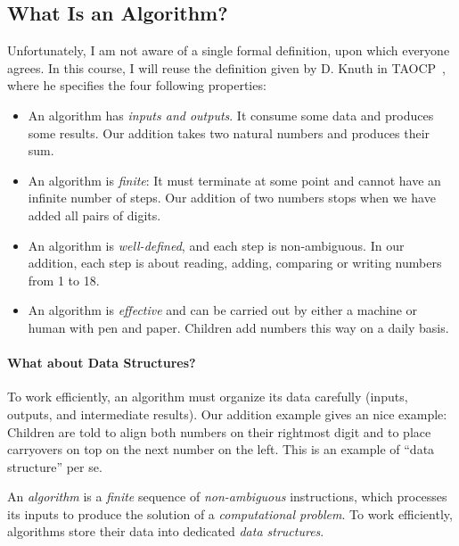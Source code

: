 \documentclass {aldast}
\begin{document}
\subsection{What Is an Algorithm?}

Unfortunately, I am not aware of a single formal definition, upon
which everyone agrees. In this course,
I will reuse the definition given by D. Knuth in
TAOCP~\cite[p. 5--6]{knuth1978}, where he specifies the four following
properties:
\begin{itemize}
\item An algorithm has \emph{inputs and outputs}. It consume some data
  and produces some results. Our addition takes two natural numbers
  and produces their sum.
\item An algorithm is \emph{finite}: It must terminate at some point
  and cannot have an infinite number of steps. Our addition of two
  numbers stops when we have added all pairs of digits.
\item An algorithm is \emph{well-defined}, and each step is
  non-ambiguous. In our addition, each step is about reading, adding,
  comparing or writing numbers from 1 to 18.
\item An algorithm is \emph{effective} and can be carried out by
  either a machine or human with pen and paper. Children add numbers
  this way on a daily basis.
\end{itemize}



\paragraph{What about Data Structures?} To work efficiently, an
algorithm must organize its data carefully (inputs, outputs, and
intermediate results). Our addition example gives an nice example:
Children are told to align both numbers on their rightmost digit and
to place carryovers on top on the next number on the left. This is an
example of ``data structure'' per se.

\begin{takeaway}
  An \emph{algorithm} is a \emph{finite} sequence of
  \emph{non-ambiguous} instructions, which processes its inputs to
  produce the solution of a \emph{computational problem}. To work
  efficiently, algorithms store their data into dedicated \emph{data
    structures}.
\end{takeaway}
\end{document}
